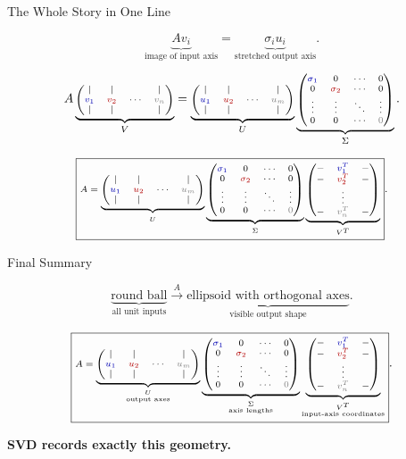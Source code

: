 \documentclass[10pt]{beamer}
\theoremstyle{definition}
\newcommand{\x}[1]{\alert{\textbf{#1}}}
\newcommand{\rd}[1]{{\color{red!70!black}#1}}
\newcommand{\bl}[1]{{\color{blue!70!black}#1}}
\newcommand{\gry}[1]{{\color{gray}#1}}
\newcommand{\Vcols}{\begin{pmatrix}|&|& &|\\ \bl{v_1}&\rd{v_2}&\cdots&\gry{v_n}\\ |&|& &|\end{pmatrix}}
\newcommand{\Ucols}{\begin{pmatrix}|&|& &|\\ \bl{u_1}&\rd{u_2}&\cdots&\gry{u_m}\\ |&|& &|\end{pmatrix}}
\newcommand{\Vrows}{\begin{pmatrix}-&\bl{v_1^T}&-\\ -&\rd{v_2^T}&-\\ &\vdots&\\ -&\gry{v_n^T}&-\end{pmatrix}}
\newcommand{\Sigdisplay}{\begin{pmatrix}\bl{\sigma_1}&0&\cdots&0\\ 0&\rd{\sigma_2}&\cdots&0\\ \vdots&\vdots&\ddots&\vdots\\ 0&0&\cdots&\gry{0}\end{pmatrix}}
\newcommand{\svdproduct}{\underbrace{\Ucols}_{U}\underbrace{\Sigdisplay}_{\Sigma}\underbrace{\Vrows}_{V^T}}
\begin{document}
\begin{frame}[shrink=15]{The Whole Story in One Line}

$$
\underbrace{Av_i}_{\text{image of input axis}}
=
\underbrace{\sigma_i u_i}_{\text{stretched output axis}}.
$$

\vfill

\[
\scriptsize
A
\underbrace{\Vcols}_{V}
=
\underbrace{\Ucols}_{U}
\underbrace{\Sigdisplay}_{\Sigma}.
\]

\[
\scriptsize
\boxed{
A=
\svdproduct
}.
\]

\end{frame}


\begin{frame}[shrink=15]{Final Summary}

$$
\boxed{
\underbrace{\text{round ball}}_{\text{all unit inputs}}
\xrightarrow{\ A\ }
\underbrace{\text{ellipsoid with orthogonal axes}}_{\text{visible output shape}}
}.
$$

\vfill

\[
\scriptsize
\boxed{
A=
\underbrace{\Ucols}_{\substack{U\\\text{output axes}}}
\underbrace{\Sigdisplay}_{\substack{\Sigma\\\text{axis lengths}}}
\underbrace{\Vrows}_{\substack{V^T\\\text{input-axis coordinates}}}
}.
\]

\vfill

\begin{center}
{\Large \x{SVD records exactly this geometry.}}
\end{center}

\end{frame}
\end{document}
